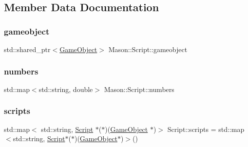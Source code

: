 \subsection{Member Data Documentation}
\hypertarget{class_mason_1_1_script_a26ffab9ad2a0f22cb6a3cba3029a985f}{}\label{class_mason_1_1_script_a26ffab9ad2a0f22cb6a3cba3029a985f} 
\subsubsection{\texorpdfstring{gameobject}{gameobject}}
{\footnotesize\ttfamily std\+::shared\+\_\+ptr$<$\hyperlink{class_mason_1_1_game_object}{Game\+Object}$>$ Mason\+::\+Script\+::gameobject}

\hypertarget{class_mason_1_1_script_aea1a14b7709c72400c5e1355f57234da}{}\label{class_mason_1_1_script_aea1a14b7709c72400c5e1355f57234da} 
\subsubsection{\texorpdfstring{numbers}{numbers}}
{\footnotesize\ttfamily std\+::map$<$std\+::string, double$>$ Mason\+::\+Script\+::numbers}

\hypertarget{class_mason_1_1_script_ad7f94424b50f1a841d25c5efe95f3c73}{}\label{class_mason_1_1_script_ad7f94424b50f1a841d25c5efe95f3c73} 
\subsubsection{\texorpdfstring{scripts}{scripts}}
{\footnotesize\ttfamily std\+::map$<$ std\+::string, \hyperlink{class_mason_1_1_script}{Script} $\ast$($\ast$)(\hyperlink{class_mason_1_1_game_object}{Game\+Object} $\ast$)$>$ Script\+::scripts = std\+::map$<$std\+::string, \hyperlink{class_mason_1_1_script}{Script}$\ast$($\ast$)(\hyperlink{class_mason_1_1_game_object}{Game\+Object}$\ast$)$>$()\hspace{0.3cm}{\ttfamily [static]}}

\hypertarget{class_mason_1_1_script_a96f691d0ccd8db2e3e95824e8579cc42}{}\label{class_mason_1_1_script_a96f691d0ccd8db2e3e95824e8579cc42} 
